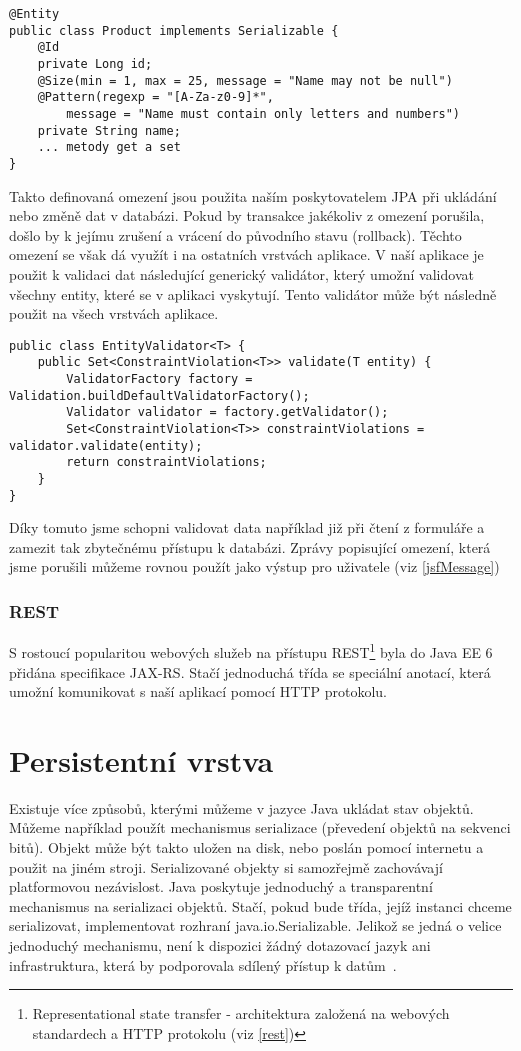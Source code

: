 \documentclass[122pt,oneside]{fithesis}
\begin{document}
\begin{lstlisting}
@Entity
public class Product implements Serializable {
	@Id
	private Long id;
	@Size(min = 1, max = 25, message = "Name may not be null")
	@Pattern(regexp = "[A-Za-z0-9]*", 
		message = "Name must contain only letters and numbers")
	private String name;
	... metody get a set
}
\end{lstlisting}

Takto definovaná omezení jsou použita naším poskytovatelem JPA při ukládání nebo změně dat v databázi. Pokud by transakce jakékoliv z omezení porušila, došlo by k jejímu zrušení a vrácení do původního stavu (rollback). Těchto omezení se však dá využít i na ostatních vrstvách aplikace. V naší aplikace je použit k validaci dat následující generický validátor, který umožní validovat všechny entity, které se v aplikaci vyskytují. Tento validátor může být následně použit na všech vrstvách aplikace.

\begin{lstlisting}
public class EntityValidator<T> {
	public Set<ConstraintViolation<T>> validate(T entity) {
		ValidatorFactory factory = Validation.buildDefaultValidatorFactory();
		Validator validator = factory.getValidator();
		Set<ConstraintViolation<T>> constraintViolations = validator.validate(entity);
		return constraintViolations;
	}
}
\end{lstlisting}

Díky tomuto jsme schopni validovat data například již při čtení z formuláře a zamezit tak zbytečnému přístupu k databázi. Zprávy popisující omezení, která jsme porušili můžeme rovnou použít jako výstup pro uživatele (viz \ref{jsfMessage})

\subsection{REST}
S rostoucí popularitou webových služeb na přístupu REST\footnote[2]{Representational state transfer - architektura založená na webových standardech a HTTP protokolu (viz \ref{rest})} byla do Java EE 6 přidána specifikace JAX-RS. Stačí jednoduchá třída se speciální anotací, která umožní komunikovat s naší aplikací pomocí HTTP protokolu.

\chapter{Persistentní vrstva}
Existuje více způsobů, kterými můžeme v jazyce Java ukládat stav objektů. Můžeme například použít mechanismus serializace (převedení objektů na sekvenci bitů). Objekt může být takto uložen na disk, nebo poslán pomocí internetu a použit na jiném stroji. Serializované objekty si samozřejmě zachovávají platformovou nezávislost. Java poskytuje jednoduchý a transparentní mechanismus na serializaci objektů. Stačí, pokud bude třída, jejíž instanci chceme serializovat, implementovat rozhraní java.io.Serializable. Jelikož se jedná o velice jednoduchý mechanismu, není k dispozici žádný dotazovací jazyk ani infrastruktura, která by podporovala sdílený přístup k datům~\cite{goncalves09}.
\end{document}

